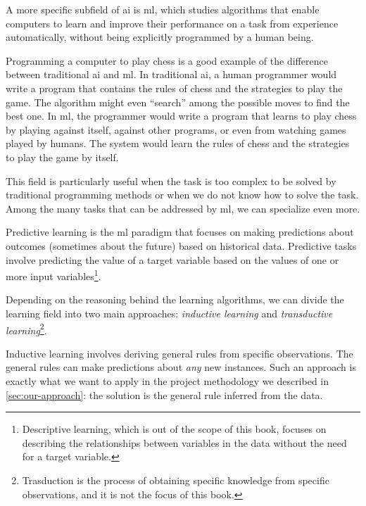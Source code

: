 A more specific subfield of \gls{ai} is \gls{ml}, which studies algorithms that
enable computers to learn and improve their performance on a task from
experience automatically, without being explicitly programmed by a human being.

Programming a computer to play chess is a good example of the difference between
traditional \gls{ai} and \gls{ml}.  In traditional \gls{ai}, a human programmer
would write a program that contains the rules of chess and the strategies to play the game.
The algorithm might even ``search'' among the possible moves to find the best one.  In
\gls{ml}, the programmer would write a program that learns to play chess by playing
against itself, against other programs, or even from watching games played by humans.
The system would learn the rules of chess and the strategies to play the game by itself.

This field is particularly useful when the task is too complex to be solved by
traditional programming methods or when we do not know how to solve the task.
Among the many tasks that can be addressed by \gls{ml}, we can specialize even more.

Predictive learning is the \gls{ml} paradigm that focuses on making predictions about
outcomes (sometimes about the future) based on historical data.  Predictive tasks
involve predicting the value of a target variable based on the values of one or more
input variables\footnote{Descriptive learning, which is out of the scope of this book,
focuses on describing the relationships between variables in the data without the
need for a target variable.}.

Depending on the reasoning behind the learning algorithms, we can divide the learning
field into two main approaches: \emph{inductive learning} and \emph{transductive
learning}\footnote{Trasduction is the process of obtaining specific knowledge from specific
observations, and it is not the focus of this book.}.

Inductive learning involves deriving general rules from specific observations.  The
general rules can make predictions about \emph{any} new instances.  Such an approach
is exactly what we want to apply in the project methodology we described in
\cref{sec:our-approach}:  the solution is the general rule inferred from the data.

